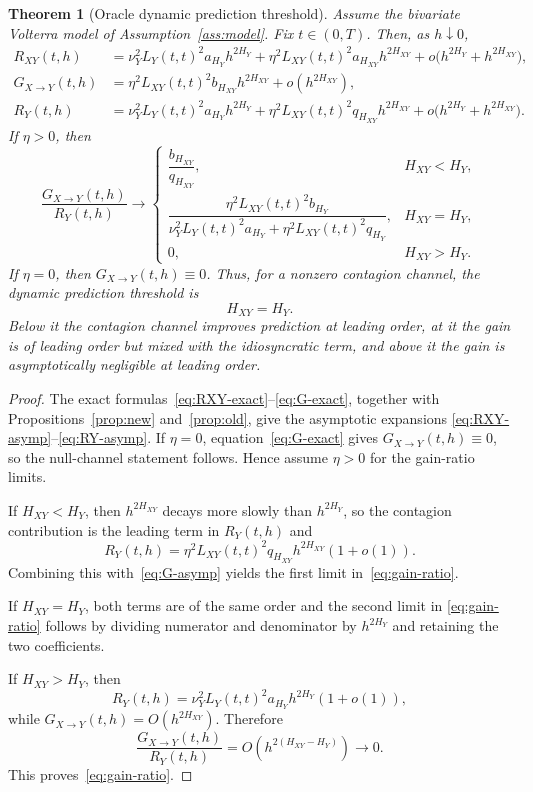 \documentclass[11pt,a4paper]{amsart}
\theoremstyle{plain}
\newtheorem{theorem}{Theorem}[section]
\theoremstyle{definition}
\theoremstyle{remark}
\begin{document}
\begin{theorem}[Oracle dynamic prediction threshold]\label{thm:prediction-threshold}
Assume the bivariate Volterra model of Assumption~\ref{ass:model}. Fix $t\in(0,T)$. Then, as
$h\downarrow0$,
\begin{align}
R_{XY}(t,h)
&=
\nu_Y^2 L_Y(t,t)^2 a_{H_Y} h^{2H_Y}
+ \eta^2 L_{XY}(t,t)^2 a_{H_{XY}} h^{2H_{XY}}
+ o\!\bigl(h^{2H_Y}+h^{2H_{XY}}\bigr), \label{eq:RXY-asymp}\\
G_{X\to Y}(t,h)
&=
\eta^2 L_{XY}(t,t)^2 b_{H_{XY}} h^{2H_{XY}}
+ o(h^{2H_{XY}}), \label{eq:G-asymp}\\
R_Y(t,h)
&=
\nu_Y^2 L_Y(t,t)^2 a_{H_Y} h^{2H_Y}
+ \eta^2 L_{XY}(t,t)^2 q_{H_{XY}} h^{2H_{XY}}
+ o\!\bigl(h^{2H_Y}+h^{2H_{XY}}\bigr). \label{eq:RY-asymp}
\end{align}
If \(\eta>0\), then
\begin{equation}\label{eq:gain-ratio}
\frac{G_{X\to Y}(t,h)}{R_Y(t,h)}
\longrightarrow
\begin{cases}
\dfrac{b_{H_{XY}}}{q_{H_{XY}}}, & H_{XY}<H_Y,\\[12pt]
\dfrac{\eta^2L_{XY}(t,t)^2 b_{H_Y}}
{\nu_Y^2L_Y(t,t)^2 a_{H_Y}+\eta^2L_{XY}(t,t)^2 q_{H_Y}},
& H_{XY}=H_Y,\\[12pt]
0, & H_{XY}>H_Y.
\end{cases}
\end{equation}
If \(\eta=0\), then \(G_{X\to Y}(t,h)\equiv0\). Thus, for a nonzero contagion channel, the
dynamic prediction threshold is
\[
H_{XY}=H_Y.
\]
Below it the contagion channel improves prediction at leading order, at it the gain is of leading
order but mixed with the idiosyncratic term, and above it the gain is asymptotically negligible at
leading order.
\end{theorem}

\begin{proof}
The exact formulas~\eqref{eq:RXY-exact}--\eqref{eq:G-exact}, together with
Propositions~\ref{prop:new} and~\ref{prop:old}, give the asymptotic expansions
\eqref{eq:RXY-asymp}--\eqref{eq:RY-asymp}. If \(\eta=0\), equation~\eqref{eq:G-exact}
gives \(G_{X\to Y}(t,h)\equiv0\), so the null-channel statement follows. Hence assume
\(\eta>0\) for the gain-ratio limits.

If $H_{XY}<H_Y$, then $h^{2H_{XY}}$ decays more slowly than $h^{2H_Y}$, so the
contagion contribution is the leading term in $R_Y(t,h)$ and
\[
R_Y(t,h)
=
\eta^2 L_{XY}(t,t)^2 q_{H_{XY}} h^{2H_{XY}}(1+o(1)).
\]
Combining this with~\eqref{eq:G-asymp} yields the first limit in~\eqref{eq:gain-ratio}.

If $H_{XY}=H_Y$, both terms are of the same order and the second limit in
\eqref{eq:gain-ratio} follows by dividing numerator and denominator by
$h^{2H_Y}$ and retaining the two coefficients.

If $H_{XY}>H_Y$, then
\[
R_Y(t,h)
=
\nu_Y^2 L_Y(t,t)^2 a_{H_Y} h^{2H_Y}(1+o(1)),
\]
while $G_{X\to Y}(t,h)=O(h^{2H_{XY}})$. Therefore
\[
\frac{G_{X\to Y}(t,h)}{R_Y(t,h)}
=
O(h^{2(H_{XY}-H_Y)})
\longrightarrow 0.
\]
This proves~\eqref{eq:gain-ratio}.
\end{proof}
\end{document}
